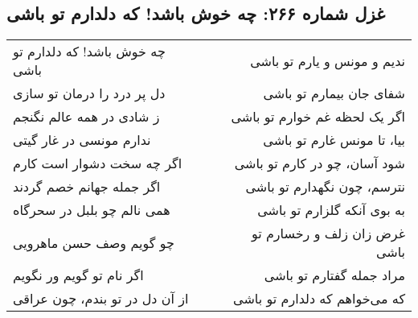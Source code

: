 \begin{center}
\section*{غزل شماره ۲۶۶: چه خوش باشد! که دلدارم تو باشی}
\label{sec:266}
\begin{longtable}{l p{0.5cm} r}
چه خوش باشد! که دلدارم تو باشی
&&
ندیم و مونس و یارم تو باشی
\\
دل پر درد را درمان تو سازی
&&
شفای جان بیمارم تو باشی
\\
ز شادی در همه عالم نگنجم
&&
اگر یک لحظه غم خوارم تو باشی
\\
ندارم مونسی در غار گیتی
&&
بیا، تا مونس غارم تو باشی
\\
اگر چه سخت دشوار است کارم
&&
شود آسان، چو در کارم تو باشی
\\
اگر جمله جهانم خصم گردند
&&
نترسم، چون نگهدارم تو باشی
\\
همی نالم چو بلبل در سحرگاه
&&
به بوی آنکه گلزارم تو باشی
\\
چو گویم وصف حسن ماهرویی
&&
غرض زان زلف و رخسارم تو باشی
\\
اگر نام تو گویم ور نگویم
&&
مراد جمله گفتارم تو باشی
\\
از آن دل در تو بندم، چون عراقی
&&
که می‌خواهم که دلدارم تو باشی
\\
\end{longtable}
\end{center}
